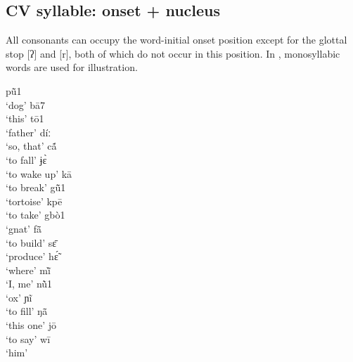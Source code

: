 \documentclass[output=paper]{langscibook}
\begin{document}
\subsection{ CV syllable: onset + nucleus}
\label{sec:traore:cvsyllable:2b}

All consonants can occupy the word-initial onset position except for the glottal stop [ʔ] and [r], both of which do not occur in this position. In , monosyllabic words are used for illustration.

\begin{exe}
    \ex \label{ex:traore:initialConsonants:8}
    \begin{multicols}{3}\raggedcolumns
        \begin{xlist}
            \ex pũ̄1\\
                `dog'
            \ex bā7\\
                `this'
            \ex tō1\\
                `father'
            \ex díː\\
                `so, that'
            \ex cã́ \\
                `to fall'
            \ex ɉɛ̀ \\
                `to wake up'
            \ex kā\\
                `to break'
            \columnbreak\ex gũ̄1 \\
                `tortoise'
            \ex  kpē\\
                `to take'
            \ex gbò1 \\
                `gnat'
            \ex  fã̄ \\
                `to build'
            \ex  sɛ̄ \\
                `produce'
            \ex hɛ̃́ \\
                `where'
            \ex mĩ̀\\
                `I, me'
            \columnbreak\ex nũ̀1 \\
                `ox'
            \ex ɲĩ\\
                `to fill'
            \ex ŋã̄ \\
                `this one'
            \ex  jō\\
                `to say'
            \ex  wī  \\
                `him'
        \end{xlist}
    \end{multicols}
\end{exe}
\end{document}
